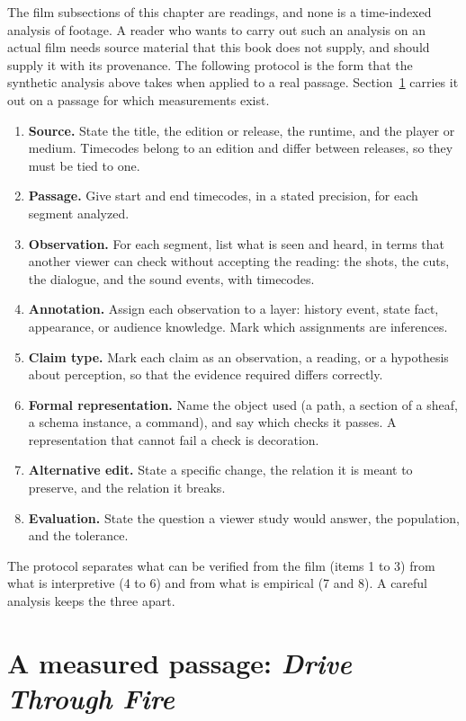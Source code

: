The film subsections of this chapter are readings, and none is a time-indexed analysis of footage. A reader who wants to carry out such an analysis on an actual film needs source material that this book does not supply, and should supply it with its provenance. The following protocol is the form that the synthetic analysis above takes when applied to a real passage. Section~\ref{sec:real} carries it out on a passage for which measurements exist.
\begin{enumerate}
\item \textbf{Source.} State the title, the edition or release, the runtime, and the player or medium. Timecodes belong to an edition and differ between releases, so they must be tied to one.
\item \textbf{Passage.} Give start and end timecodes, in a stated precision, for each segment analyzed.
\item \textbf{Observation.} For each segment, list what is seen and heard, in terms that another viewer can check without accepting the reading: the shots, the cuts, the dialogue, and the sound events, with timecodes.
\item \textbf{Annotation.} Assign each observation to a layer: history event, state fact, appearance, or audience knowledge. Mark which assignments are inferences.
\item \textbf{Claim type.} Mark each claim as an observation, a reading, or a hypothesis about perception, so that the evidence required differs correctly.
\item \textbf{Formal representation.} Name the object used (a path, a section of a sheaf, a schema instance, a command), and say which checks it passes. A representation that cannot fail a check is decoration.
\item \textbf{Alternative edit.} State a specific change, the relation it is meant to preserve, and the relation it breaks.
\item \textbf{Evaluation.} State the question a viewer study would answer, the population, and the tolerance.
\end{enumerate}
The protocol separates what can be verified from the film (items 1 to 3) from what is interpretive (4 to 6) and from what is empirical (7 and 8). A careful analysis keeps the three apart.

\section{A measured passage: \emph{Drive Through Fire}}\label{sec:real}

